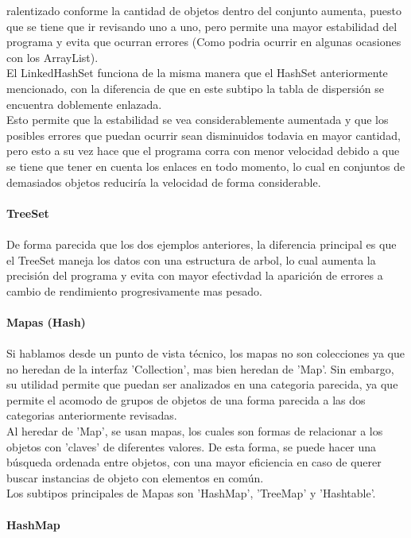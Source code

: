\documentclass{article}
\begin{document}
	ralentizado conforme la cantidad de objetos dentro del conjunto aumenta, puesto que se tiene que ir revisando uno a uno, pero permite una mayor estabilidad del programa y evita que ocurran errores (Como podria ocurrir en algunas ocasiones con los ArrayList).
	\\
	El LinkedHashSet funciona de la misma manera que el HashSet anteriormente mencionado, con la diferencia de que en este subtipo la tabla de dispersión se encuentra doblemente enlazada. 
	\\
	Esto permite que la estabilidad se vea considerablemente aumentada y que los posibles errores que puedan ocurrir 
	sean disminuidos todavia en mayor cantidad, pero esto a su vez hace que el programa corra con menor velocidad debido a que se tiene que tener en cuenta los enlaces en todo momento, lo cual en conjuntos de demasiados objetos reduciría la velocidad de forma considerable.
	\\
	\\
	\large \textbf{TreeSet}
	\\
	\\
	\normalsize De forma parecida que los dos ejemplos anteriores, la diferencia principal es que el TreeSet maneja los datos con una estructura de arbol, lo cual aumenta la precisión del programa y evita con mayor efectivdad la aparición de errores a cambio de rendimiento progresivamente mas pesado.
	\\
	\\
	\Large \textbf{Mapas (Hash)}
	\\
	\\
	\normalsize Si hablamos desde un punto de vista técnico, los mapas no son colecciones ya que no heredan de la interfaz 'Collection', mas bien heredan de 'Map'. Sin embargo, su utilidad permite que puedan ser analizados en una categoria parecida, ya que permite el acomodo de grupos de objetos de una forma parecida a 	las dos categorias anteriormente revisadas.
	\\
	Al heredar de 'Map', se usan mapas, los cuales son formas de relacionar a los objetos con 'claves' de diferentes valores. De esta forma, se puede hacer una búsqueda ordenada entre objetos, con una mayor eficiencia en caso de querer buscar instancias de objeto con elementos en común.
	\\
	Los subtipos principales de Mapas son 'HashMap', 'TreeMap' y 'Hashtable'.
	\\
	\\
	\large \textbf{HashMap}
	\\
	\\
\end{document}
